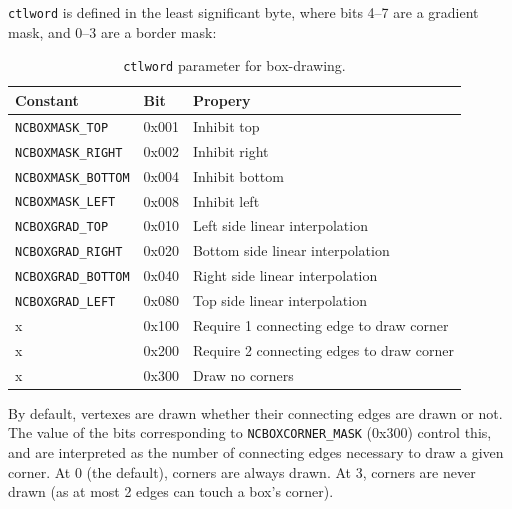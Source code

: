 \documentclass[letterpaper,10pt]{article}
\begin{document}
\texttt{ctlword} is defined in the least significant byte, where bits 4--7 are a
gradient mask, and 0--3 are a border mask:

\begin{table}[!htb]
  \centering
  \begin{tabular}{|l|l|l|}
    \hline
    Constant & Bit & Propery \\
    \hline
    \hline
    \texttt{NCBOXMASK\_TOP} & 0x001 & Inhibit top \\
    \hline
    \texttt{NCBOXMASK\_RIGHT} & 0x002 & Inhibit right \\
    \hline
    \texttt{NCBOXMASK\_BOTTOM} & 0x004 & Inhibit bottom \\
    \hline
    \texttt{NCBOXMASK\_LEFT} & 0x008 & Inhibit left \\
    \hline
    \texttt{NCBOXGRAD\_TOP} & 0x010 & Left side linear interpolation \\
    \hline
    \texttt{NCBOXGRAD\_RIGHT} & 0x020 & Bottom side linear interpolation \\
    \hline
    \texttt{NCBOXGRAD\_BOTTOM} & 0x040 & Right side linear interpolation \\
    \hline
    \texttt{NCBOXGRAD\_LEFT} & 0x080 & Top side linear interpolation \\
    \hline
    x & 0x100 & Require 1 connecting edge to draw corner \\
    \hline
    x & 0x200 & Require 2 connecting edges to draw corner \\
    \hline
    x & 0x300 & Draw no corners \\
    \hline
  \end{tabular}
  \caption{\texttt{ctlword} parameter for box-drawing.}
  \label{table:boxes}
\end{table}

By default, vertexes are drawn whether their connecting edges are drawn or
not. The value of the bits corresponding to \texttt{NCBOXCORNER\_MASK} (0x300)
control this, and are interpreted as the number of connecting edges necessary to draw a
given corner. At 0 (the default), corners are always drawn. At 3, corners
are never drawn (as at most 2 edges can touch a box's corner).
\end{document}
